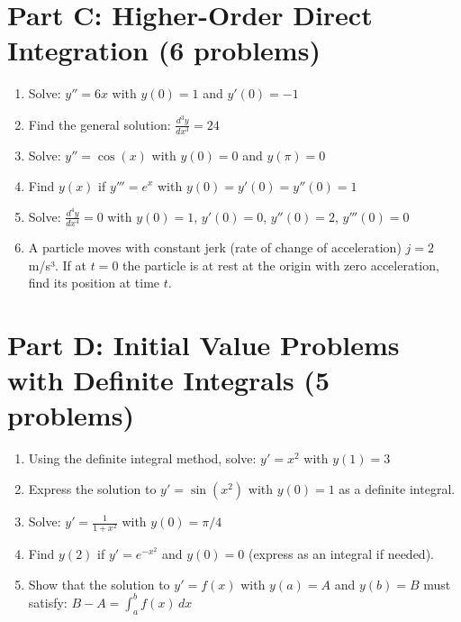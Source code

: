\documentclass[12pt]{article}
\begin{document}
\section*{Part C: Higher-Order Direct Integration (6 problems)}

\begin{enumerate}[resume]
\item Solve: $y'' = 6x$ with $y(0) = 1$ and $y'(0) = -1$

\item Find the general solution: $\frac{d^3y}{dx^3} = 24$

\item Solve: $y'' = \cos(x)$ with $y(0) = 0$ and $y(\pi) = 0$

\item Find $y(x)$ if $y''' = e^x$ with $y(0) = y'(0) = y''(0) = 1$

\item Solve: $\frac{d^4y}{dx^4} = 0$ with $y(0) = 1$, $y'(0) = 0$, $y''(0) = 2$, $y'''(0) = 0$

\item A particle moves with constant jerk (rate of change of acceleration) $j = 2$ m/s³. If at $t = 0$ the particle is at rest at the origin with zero acceleration, find its position at time $t$.
\end{enumerate}

\section*{Part D: Initial Value Problems with Definite Integrals (5 problems)}

\begin{enumerate}[resume]
\item Using the definite integral method, solve: $y' = x^2$ with $y(1) = 3$

\item Express the solution to $y' = \sin(x^2)$ with $y(0) = 1$ as a definite integral.

\item Solve: $y' = \frac{1}{1+x^2}$ with $y(0) = \pi/4$

\item Find $y(2)$ if $y' = e^{-x^2}$ and $y(0) = 0$ (express as an integral if needed).

\item Show that the solution to $y' = f(x)$ with $y(a) = A$ and $y(b) = B$ must satisfy: $B - A = \int_a^b f(x)\,dx$
\end{enumerate}
\end{document}
